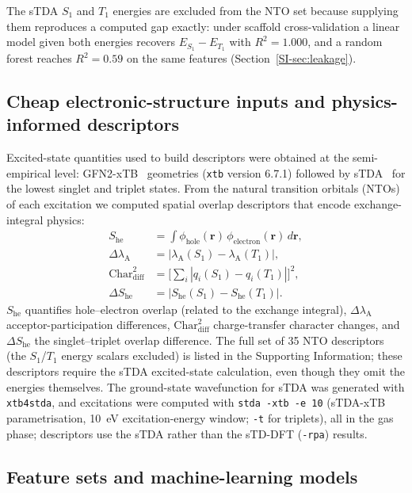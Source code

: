 The sTDA $S_1$ and $T_1$ energies are excluded from the NTO set because supplying them
reproduces a computed gap exactly: under scaffold cross-validation a linear model given
both energies recovers $E_{S_1}-E_{T_1}$ with $R^2 = 1.000$, and a random forest reaches
$R^2 = 0.59$ on the same features (Section~\ref{SI-sec:leakage}).

\subsection{Cheap electronic-structure inputs and physics-informed descriptors}

Excited-state quantities used to build descriptors were obtained at the
semi-empirical level: GFN2-xTB~\cite{Bannwarth2019} geometries
(\texttt{xtb} version 6.7.1) followed by sTDA~\cite{Grimme2017} for the lowest singlet
and triplet states. From the natural transition orbitals
(NTOs)~\cite{Martin2003} of each excitation we computed spatial overlap
descriptors that encode exchange-integral physics:
\begin{align}
  S_\text{he} &= \int \phi_\text{hole}(\mathbf{r})\,\phi_\text{electron}(\mathbf{r})\,d\mathbf{r}, \label{eq:overlap}\\
  \Delta\lambda_\text{A} &= |\lambda_\text{A}(S_1) - \lambda_\text{A}(T_1)|, \label{eq:delta_lambda}\\
  \text{Char}_\text{diff}^2 &= \Big[\textstyle\sum_i |q_i(S_1) - q_i(T_1)|\Big]^2, \label{eq:char_diff}\\
  \Delta S_\text{he} &= |S_\text{he}(S_1) - S_\text{he}(T_1)|. \label{eq:delta_overlap}
\end{align}
$S_\text{he}$ quantifies hole--electron overlap (related to the exchange
integral), $\Delta\lambda_\text{A}$ acceptor-participation differences,
$\text{Char}_\text{diff}^2$ charge-transfer character changes, and
$\Delta S_\text{he}$ the singlet--triplet overlap difference. The full set of
\num{35} NTO descriptors (the $S_1$/$T_1$ energy scalars excluded) is listed in
the Supporting Information; these descriptors require the sTDA excited-state
calculation, even though they omit the energies themselves.
The ground-state wavefunction for sTDA was generated with \texttt{xtb4stda}, and
excitations were computed with \texttt{stda -xtb -e 10} (sTDA-xTB parametrisation,
\qty{10}{\electronvolt} excitation-energy window; \texttt{-t} for triplets), all in the
gas phase; descriptors use the sTDA rather than the sTD-DFT (\texttt{-rpa}) results.

\subsection{Feature sets and machine-learning models}

